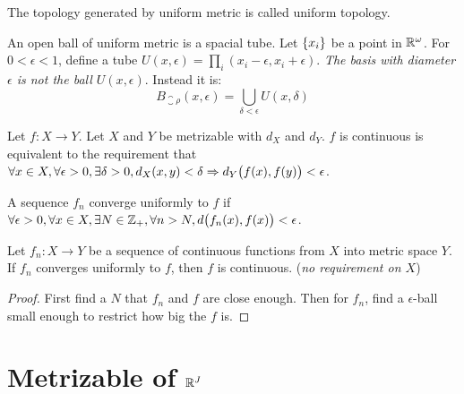 \begin{definition}
    The topology generated by uniform metric is called uniform topology.
    
    An open ball of uniform metric is a spacial tube. Let $\set{x_i}$ be a point in $\mathbb{R}^\omega$. For $0 < \epsilon < 1$, define a tube $U(x,\epsilon) = \prod_i (x_i - \epsilon, x_i + \epsilon)$. \emph{The basis with diameter $\epsilon$ is not the ball $U(x, \epsilon)$}. Instead it is:
    \begin{equation}
        B_{\closure{\rho}}(x, \epsilon) = \bigcup_{\delta < \epsilon} U(x, \delta)
    \end{equation}
\end{definition}

\begin{theorem}
Let $f: X \rightarrow Y$. Let $X$ and $Y$ be metrizable with $d_X$ and $d_Y$. $f$ is continuous is equivalent to the requirement that $\forall x \in X, \forall \epsilon > 0, \exists \delta > 0, d_X (x,y) < \delta \Rightarrow d_Y \mleft(f(x), f(y) \mright) < \epsilon $.
\end{theorem}




\begin{definition}\label{converge_uniformly}
    A sequence $f_n$ converge uniformly to $f$ if $\forall \epsilon > 0,\forall x \in X, \exists N \in \mathbb{Z}_{+}, \forall n > N, d \mleft( f_n (x) , f(x) \mright) < \epsilon$.
\end{definition}

\begin{theorem}
    Let $f_n: X \rightarrow Y$ be a sequence of continuous functions from $X$ into metric space $Y$. If $f_n$ converges uniformly to $f$, then $f$ is continuous. (\emph{no requirement on $X$})
\end{theorem}
\begin{proof}
    First find a $N$ that $f_n$ and $f$ are close enough. Then for $f_n$, find a $\epsilon$-ball small enough to restrict how big the $f$ is.
\end{proof}






\section{Metrizable of $\mathbb{R}^J$}


